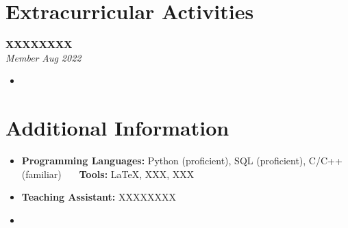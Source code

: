 \documentclass[10.5pt,a4paper]{extarticle}%
\newcommand{\resumeItemWithoutTitle}[1]{
  \vspace{-3pt}\item\small{
    {#1}\vspace{-5pt}
  }
}
\newcommand{\resumeHeading}[4]{
\textbf{#1}\hfill #2\\
  \textit{\small#3} \hfill \textit{\small #4} \\
}
\newcommand{\resumeItemListStart}{\begin{itemize}[leftmargin=*]\vspace{-5pt}}
\newcommand{\resumeItemListEnd}{\end{itemize}\vspace{-5pt}}
\begin{document}
    
\vspace{0pt}
\section{Extracurricular Activities}
    \resumeHeading{XXXXXXXX}{}
    {Member}{Aug 2022}
    \resumeItemListStart
    \resumeItemWithoutTitle{\lipsum[75]}
    \resumeItemListEnd
    

\vspace{0pt}
\section{Additional Information}
    \vspace{7pt}
    \resumeItemListStart
    \resumeItemWithoutTitle{\textbf{Programming Languages:} Python (proficient), SQL (proficient), C/C++ (familiar) ~~~\textbf{Tools:} \LaTeX, XXX, XXX} 
    \resumeItemWithoutTitle{\textbf{Teaching Assistant:} XXXXXXXX}
    \resumeItemWithoutTitle{\lipsum[75]}
    \resumeItemListEnd
\end{document}
